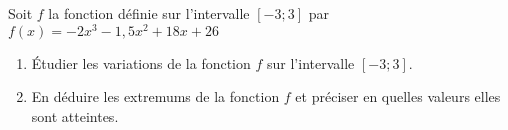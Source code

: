 \documentclass{beamer}
\begin{document}
    \begin{frame}
     \begin{example}
  
    Soit $f$ la fonction définie sur l'intervalle $[-3;3]$ par $f(x)=-2x^3 -1,5x^2+18 x + 26$
    
    \begin{enumerate}
     \item \'Etudier les variations de la fonction $f$ sur l'intervalle $[-3;3]$.
     \item En déduire les extremums de la fonction $f$ et préciser en quelles valeurs elles sont
     atteintes.
    \end{enumerate}
    \end{example}
    \end{frame}


  
  
\end{document}
